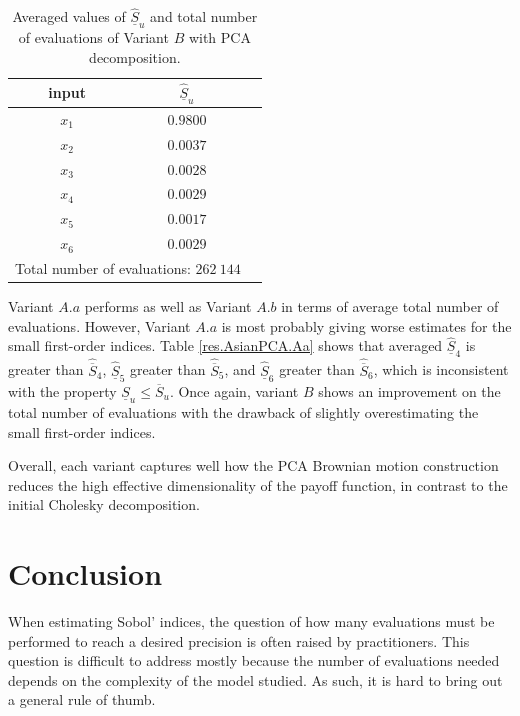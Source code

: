 \begin{table}[!ht]
\caption{Averaged values of $\widehat{\underline{S}}_u$ and total number of evaluations of Variant $B$ with PCA decomposition.}
\centering
\begin{tabular}{ccc}
\hline
 input & $\widehat{\underline{S}}_u$  \\ \hline
 $x_1$ & $0.9800$ \\ \hline
 $x_2$ & $0.0037$ \\ \hline
 $x_3$ & $0.0028$ \\ \hline
 $x_4$ & $0.0029$ \\ \hline
 $x_5$ & $0.0017$ \\ \hline
 $x_6$ & $0.0029$ \\ \hline \hline
\multicolumn{2}{l}{Total number of evaluations: $262 \ 144$} \\ \hline 
\end{tabular}
\label{res.AsianPCA.B}
\end{table}
Variant $A.a$ performs as well as Variant $A.b$ in terms of average total number of evaluations. However, Variant $A.a$ is most probably giving worse estimates for the small first-order indices. Table \ref{res.AsianPCA.Aa} shows that averaged $\widehat{\underline{S}}_4$ is greater than $\widehat{\overline{S}}_4$, $\widehat{\underline{S}}_5$ greater than $\widehat{\overline{S}}_5$, and $\widehat{\underline{S}}_6$ greater than $\widehat{\overline{S}}_6$, which is inconsistent with the property ${\underline{S}}_u\leq{\overline{S}}_u$. Once again, variant $B$ shows an improvement on the total number of evaluations with the drawback of slightly overestimating the small first-order indices.

Overall, each variant captures well how the PCA Brownian motion construction reduces the high effective dimensionality of the payoff function, in contrast to the initial Cholesky decomposition.

\section{Conclusion}
When estimating Sobol' indices, the question of how many evaluations must be performed to reach a desired precision is often raised by practitioners. This question is difficult to address mostly because the number of evaluations needed depends on the complexity of the model studied. As such, it is hard to bring out a general rule of thumb. 


